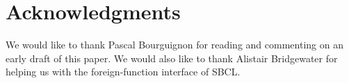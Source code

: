 \section{Acknowledgments}

We would like to thank Pascal Bourguignon for reading and commenting
on an early draft of this paper.  We would also like to thank Alistair
Bridgewater for helping us with the foreign-function interface of
SBCL.

